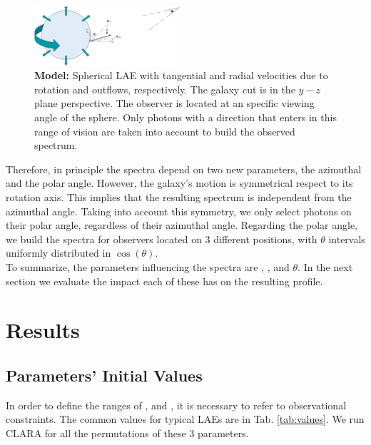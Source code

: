 \documentclass[twocolappendix]{latex/emulateapj}
\begin{document}
\begin{figure}[h!]
	\begin{center}
		\includegraphics[width=0.48\textwidth]{./figures/model}
	\end{center}
	\caption{\textbf{Model:} Spherical LAE with tangential and radial velocities due to rotation and outflows, respectively. The galaxy cut is in the $y-z$ plane perspective. The observer is located at an specific viewing angle of the sphere. Only photons with a direction that enters in this range of vision are taken into account to build the observed spectrum.
		\label{fig:model}}
\end{figure}

Therefore, in principle the spectra depend on two new parameters, the azimuthal and the polar angle. However, the galaxy's motion is symmetrical respect to its rotation axis. This implies that the resulting spectrum is independent from the azimuthal angle. Taking into account this symmetry, we only select photons on their polar angle, regardless of their azimuthal angle. Regarding the polar angle, we build the spectra for observers located on 3 different positions, with $\theta$ intervals uniformly distributed in $\cos(\theta)$. \\ 

To summarize, the parameters influencing the spectra are \vrot, \vout, \tauh and $\theta$. In the next section we evaluate the impact each of these has on the resulting profile. \\


\section{Results}
\label{sec:results}

\subsection{Parameters' Initial Values}

In order to define the ranges of \tauh, \vrot and \vout, it is necessary to refer to observational constraints. The common values for typical LAEs are in Tab. \ref{tab:values}. We run CLARA for all the permutations of these 3 parameters. \\
\end{document}

